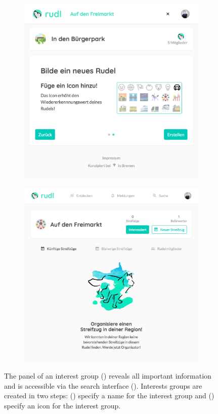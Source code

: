 \documentclass[12pt,numbers=noenddot,parskip,bibliography=totocnumbered,listof=totocnumbered,draft]{scrreprt}
\begin{document}
\begin{figure}
\begin{subfigure}[t]{0.45\textwidth}
\centering
\includegraphics[width=\linewidth]{createrudel1.png}
\caption{}
\label{createrudel1}
\end{subfigure}
\hfill
\begin{subfigure}[t]{0.45\textwidth}
\centering
\includegraphics[width=\linewidth]{rudel.png}
\caption{}
\label{rudel}
\end{subfigure}
\caption[Organization of interest groups]{The panel of an interest group () reveals all important information and is accessible via the search interface (). Interests groups are created in two steps: () specify a name for the interest group and () specify an icon for the interest group.}
\end{figure}
\end{document}

